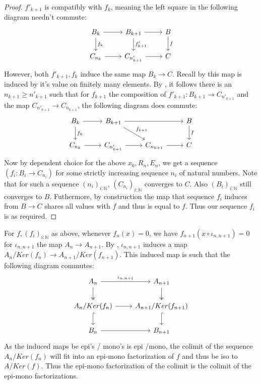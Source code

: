 \begin{proof}
  $f'_{k+1}$ is compatibly with $f_k$, meaning the left square in the following diagram needn't commute:
  \begin{equation}
    \begin{tikzcd}
      B_{k} \arrow[r] \arrow[d, "f_k"]& B_{{k+1}}  \arrow[r] \arrow[d,"f'_{k+1}"] & B \arrow[d,"f"] \\
      C_{n_k} \arrow[r] & C_{n'_{k+1}} \arrow[r]  & C 
    \end{tikzcd}
  \end{equation}
  However, both $f'_{k+1}, f_k$ induce the same map $B_{k} \to C$. 
  Recall by  this map is induced by it's value on finitely many elements. 
  By , it follows there is an $n_{k+1} \geq {n'_{k+1}}$ 
  such that for $f_{k+1}$ the composition of $f'_{k+1}:B_{k+1} \to C_{n'_{k+1}}$ and 
  the map $C_{n'_{k+1}} \to C_{n_{k+1}}$, the following diagram does commute:
  \begin{equation}
    \begin{tikzcd}
      B_{k} \arrow[d,"f_k"]\arrow[r] & B_{{k+1}} \arrow[rd, "f_{k+1}"] \arrow[rr] & & B \arrow[d,"f"] \\
      C_{n_k} \arrow[r] & C_{n'_{k+1}} \arrow[r] & C_{n_{k+1}} \arrow[r] & C 
    \end{tikzcd}
  \end{equation}
  Now by dependent choice for the above $x_0, R_n, E_n$, we get a sequence $(f_i:B_i \to C_{n_i})$  for some 
  strictly increasing sequence $n_i$ of natural numbers. 
  Note that for such a sequence $(n_i)_{i:\mathbb N}$, 
  $(C_{n_i})_{i:\mathbb N}$ converges to $C$. Also $(B_i)_{i:\mathbb N}$ still converges to $B$. 
  Futhermore, by construction the map that sequence $f_i$ induces from $B \to C$ shares all values with $f$
  and thus is equal to $f$. 
  Thus our sequence $f_i$ is as required. 
\end{proof}
\begin{remark}\label{rmkEpiMonoFactorizationCommutes}
  For $f,(f_i)_{i:\mathbb N}$ as above, whenever $f_n(x) = 0$, we have $f_{n+1}(x \circ \iota_{n,n+1}) = 0$
  for $\iota_{n,n+1}$ the map $A_n \to A_{n+1}$. 
  By , $\iota_{n,n+1}$ induces a map $A_n/Ker(f_n)\to A_{n+1}/Ker(f_{n+1})$. 
  This induced map is such that the following diagram commutes:
  \begin{equation}\begin{tikzcd}
    A_n \arrow[d, two heads] \arrow[r, "\iota_{n,n+1}"] & A_{n+1} \arrow[d,two heads]\\
    A_n /Ker(f_n) \arrow[d,hook] \arrow[r] & A_{n+1} /Ker(f_{n+1}) \arrow[d,hook] \\
    B_n \arrow[r] & B_{n+1}
  \end{tikzcd}\end{equation}  
  As the induced maps be epi's / mono's  is epi /mono, the colimit of the sequence 
  $A_n / Ker(f_n)$ will fit into an epi-mono factorization of $f$ and thus be iso to $A/Ker(f)$. 
  Thus the epi-mono factorization of the colimit is the colimit of the epi-mono factorizations. 
\end{remark}
